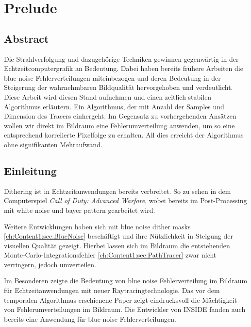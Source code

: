 
\chapter{Prelude}
\label{ch:Introduction}

\section{Abstract}

\vspace*{\fill}
Die Strahlverfolgung und dazugehörige Techniken gewinnen gegenwärtig in der Echtzeitcomputergrafik an Bedeutung. Dabei haben bereits frühere Arbeiten
die blue noise Fehlerverteilungen miteinbezogen und deren Bedeutung in der Steigerung der wahrnehmbaren Bildqualität hervorgehoben und verdeutlicht.
Diese Arbeit wird diesen Stand aufnehmen und einen zeitlich stabilen Algorithmus erläutern. Ein Algorithmus, der mit Anzahl der Samples und Dimension
des Tracers einhergeht. Im Gegensatz zu vorhergehenden Ansätzen wollen wir direkt im Bildraum eine Fehlerumverteilung anwenden, um so eine entsprechend 
korrelierte Pixelfolge zu erhalten. All dies erreicht der Algorithmus ohne signifikanten Mehraufwand.
\vfill

\newpage

\section{Einleitung}
\vspace*{\fill}
Dithering ist in Echtzeitanwendungen bereits verbreitet. So zu sehen in dem Computerspiel \textit{Call of Duty: Advanced Warfare}, wobei 
bereits im Post-Processing \cite{callofdutypostprocessing} mit white noise und bayer pattern gearbeitet wird.\par 
Weitere Entwicklungen \cite{georgiev2016blue} haben sich mit blue noise dither masks \ref{ch:Content1:sec:BlueNoise} beschäftigt
und ihre Nützlichkeit in Steigung der visuellen Qualität gezeigt. Hierbei lassen sich im Bildraum die entstehenden 
Monte-Carlo-Integrationsfehler \ref{ch:Content1:sec:PathTracer} zwar nicht verringern, jedoch umverteilen.\par 
Im Besonderen zeigte \cite{Sch19} die Bedeutung von blue noise Fehlerverteilung im Bildraum für Echtzeitanwendungen mit neuer
Raytracingtechnologie.
Das vor dem temporalen Algorithmus erschienene Paper \cite{heitz:hal02150657} zeigt eindrucksvoll die Mächtigkeit von 
Fehlerumverteilungen im Bildraum. 
Die Entwickler von INSIDE \cite{10.111712.152707} fanden auch bereits eine Anwendung für blue noise Fehlerverteilungen. 


